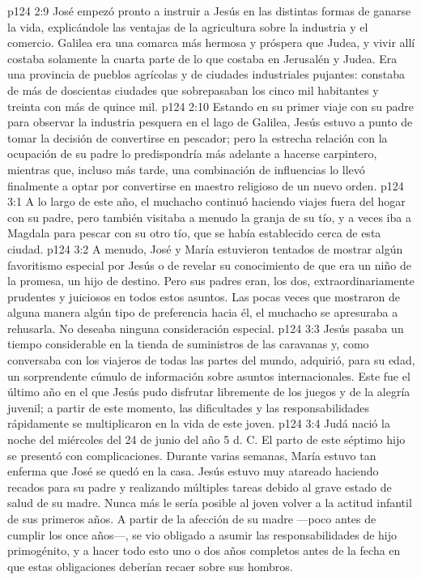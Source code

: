 \vs p124 2:9 José empezó pronto a instruir a Jesús en las distintas formas de ganarse la vida, explicándole las ventajas de la agricultura sobre la industria y el comercio. Galilea era una comarca más hermosa y próspera que Judea, y vivir allí costaba solamente la cuarta parte de lo que costaba en Jerusalén y Judea. Era una provincia de pueblos agrícolas y de ciudades industriales pujantes: constaba de más de doscientas ciudades que sobrepasaban los cinco mil habitantes y treinta con más de quince mil.
\vs p124 2:10 Estando en su primer viaje con su padre para observar la industria pesquera en el lago de Galilea, Jesús estuvo a punto de tomar la decisión de convertirse en pescador; pero la estrecha relación con la ocupación de su padre lo predispondría más adelante a hacerse carpintero, mientras que, incluso más tarde, una combinación de influencias lo llevó finalmente a optar por convertirse en maestro religioso de un nuevo orden.
\vs p124 3:1 A lo largo de este año, el muchacho continuó haciendo viajes fuera del hogar con su padre, pero también visitaba a menudo la granja de su tío, y a veces iba a Magdala para pescar con su otro tío, que se había establecido cerca de esta ciudad.
\vs p124 3:2 A menudo, José y María estuvieron tentados de mostrar algún favoritismo especial por Jesús o de revelar su conocimiento de que era un niño de la promesa, un hijo de destino. Pero sus padres eran, los dos, extraordinariamente prudentes y juiciosos en todos estos asuntos. Las pocas veces que mostraron de alguna manera algún tipo de preferencia hacia él, el muchacho se apresuraba a rehusarla. No deseaba ninguna consideración especial.
\vs p124 3:3 Jesús pasaba un tiempo considerable en la tienda de suministros de las caravanas y, como conversaba con los viajeros de todas las partes del mundo, adquirió, para su edad, un sorprendente cúmulo de información sobre asuntos internacionales. Este fue el último año en el que Jesús pudo disfrutar libremente de los juegos y de la alegría juvenil; a partir de este momento, las dificultades y las responsabilidades rápidamente se multiplicaron en la vida de este joven.
\vs p124 3:4 \pc Judá nació la noche del miércoles del 24 de junio del año 5 d. C. El parto de este séptimo hijo se presentó con complicaciones. Durante varias semanas, María estuvo tan enferma que José se quedó en la casa. Jesús estuvo muy atareado haciendo recados para su padre y realizando múltiples tareas debido al grave estado de salud de su madre. Nunca más le sería posible al joven volver a la actitud infantil de sus primeros años. A partir de la afección de su madre ---poco antes de cumplir los once años---, se vio obligado a asumir las responsabilidades de hijo primogénito, y a hacer todo esto uno o dos años completos antes de la fecha en que estas obligaciones deberían recaer sobre sus hombros.
